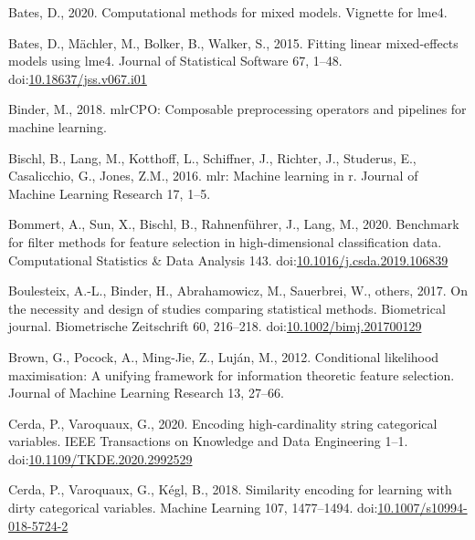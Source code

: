 \documentclass[smallextended]{svjour3}       %
\newlength{\cslhangindent}
\newlength{\cslentryspacingunit} %
\newenvironment{CSLReferences}[2] %
 {%
  \setlength{\parindent}{0pt}
  \ifodd #1
  \let\oldpar\par
  \def\par{\hangindent=\cslhangindent\oldpar}
  \fi
  \setlength{\parskip}{#2\cslentryspacingunit}
 }%
 {}
\begin{document}
\hypertarget{refs}{}
\begin{CSLReferences}{1}{0}
\leavevmode{}%
Bates, D., 2020. Computational methods for mixed models. Vignette for lme4.

\leavevmode{}%
Bates, D., Mächler, M., Bolker, B., Walker, S., 2015. Fitting linear mixed-effects models using {lme4}. Journal of Statistical Software 67, 1--48. doi:\href{https://doi.org/10.18637/jss.v067.i01}{10.18637/jss.v067.i01}

\leavevmode{}%
Binder, M., 2018. mlrCPO: Composable preprocessing operators and pipelines for machine learning.

\leavevmode{}%
Bischl, B., Lang, M., Kotthoff, L., Schiffner, J., Richter, J., Studerus, E., Casalicchio, G., Jones, Z.M., 2016. {mlr}: Machine learning in r. Journal of Machine Learning Research 17, 1--5.

\leavevmode{}%
Bommert, A., Sun, X., Bischl, B., Rahnenführer, J., Lang, M., 2020. Benchmark for filter methods for feature selection in high-dimensional classification data. Computational Statistics \& Data Analysis 143. doi:\href{https://doi.org/10.1016/j.csda.2019.106839}{10.1016/j.csda.2019.106839}

\leavevmode{}%
Boulesteix, A.-L., Binder, H., Abrahamowicz, M., Sauerbrei, W., others, 2017. On the necessity and design of studies comparing statistical methods. Biometrical journal. Biometrische Zeitschrift 60, 216--218. doi:\href{https://doi.org/10.1002/bimj.201700129}{10.1002/bimj.201700129}

\leavevmode{}%
Brown, G., Pocock, A., Ming-Jie, Z., Luján, M., 2012. Conditional likelihood maximisation: A unifying framework for information theoretic feature selection. Journal of Machine Learning Research 13, 27--66.

\leavevmode{}%
Cerda, P., Varoquaux, G., 2020. Encoding high-cardinality string categorical variables. IEEE Transactions on Knowledge and Data Engineering 1--1. doi:\href{https://doi.org/10.1109/TKDE.2020.2992529}{10.1109/TKDE.2020.2992529}

\leavevmode{}%
Cerda, P., Varoquaux, G., Kégl, B., 2018. Similarity encoding for learning with dirty categorical variables. Machine Learning 107, 1477--1494. doi:\href{https://doi.org/10.1007/s10994-018-5724-2}{10.1007/s10994-018-5724-2}


\end{CSLReferences}
\end{document}
